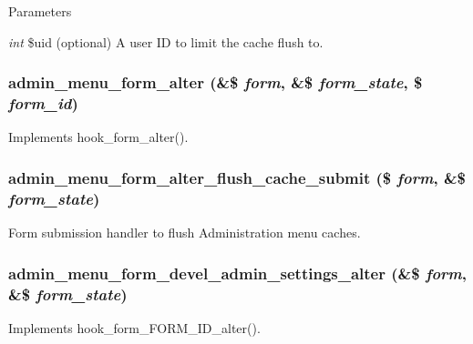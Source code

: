 \begin{DoxyParams}{Parameters}
\item[{\em int}]\$uid (optional) A user ID to limit the cache flush to. \end{DoxyParams}
\hypertarget{admin__menu_8module_a04060c85de0ebbbe01c3d5cbed3091b6}{
\subsubsection[{admin\_\-menu\_\-form\_\-alter}]{\setlength{\rightskip}{0pt plus 5cm}admin\_\-menu\_\-form\_\-alter (\&\$ {\em form}, \/  \&\$ {\em form\_\-state}, \/  \$ {\em form\_\-id})}}
\label{admin__menu_8module_a04060c85de0ebbbe01c3d5cbed3091b6}
Implements hook\_\-form\_\-alter(). \hypertarget{admin__menu_8module_a0778640fb964053659420cc3cfbef413}{
\subsubsection[{admin\_\-menu\_\-form\_\-alter\_\-flush\_\-cache\_\-submit}]{\setlength{\rightskip}{0pt plus 5cm}admin\_\-menu\_\-form\_\-alter\_\-flush\_\-cache\_\-submit (\$ {\em form}, \/  \&\$ {\em form\_\-state})}}
\label{admin__menu_8module_a0778640fb964053659420cc3cfbef413}
Form submission handler to flush Administration menu caches. \hypertarget{admin__menu_8module_a2626235c2e112a1f1afe3cb3bb5d926d}{
\subsubsection[{admin\_\-menu\_\-form\_\-devel\_\-admin\_\-settings\_\-alter}]{\setlength{\rightskip}{0pt plus 5cm}admin\_\-menu\_\-form\_\-devel\_\-admin\_\-settings\_\-alter (\&\$ {\em form}, \/  \&\$ {\em form\_\-state})}}
\label{admin__menu_8module_a2626235c2e112a1f1afe3cb3bb5d926d}
Implements hook\_\-form\_\-FORM\_\-ID\_\-alter().

